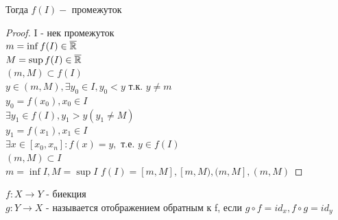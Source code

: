 \begin{consequence}
\begin{enumerate}
		Тогда $ f(I) - $ промежуток
		\begin{proof}
			I - нек промежуток \\
			$ m = \inf f(I) \in \overline{\mathbb{R}} $ \\
			$ M = \sup f(I)  \in \overline{\mathbb{R}} $ \\
			$ (m, M) \subset f(I) $ \\
			$ y \in (m, M) , \exists y_0 \in I, y_0 < y $ т.к. $ y \neq m $ \\
			$ y_0 = f(x_0), x_0 \in I $ \\
			$ \exists y_1 \in f(I), y_1 > y (y_1 \neq M)$ \\
			$ y_1 = f(x_1), x_1 \in I$\\
			$ \exists x \in [x_0, x_n] : f(x) = y,$ т.е. $ y \in f(I) $ \\
			$ (m, M) \subset I $\\
			$ m = \inf I, M = \sup I $
			$ f(I) = [m,M], [m, M), (m, M], (m, M) $
		\end{proof}
	\end{enumerate}
\end{consequence}

\noindent
$ f : X \rightarrow Y $ - биекция \\
$ g : Y \rightarrow X $ - называется отображением обратным к f, если 
$ g \circ f = id_x, f \circ g = id_y $

